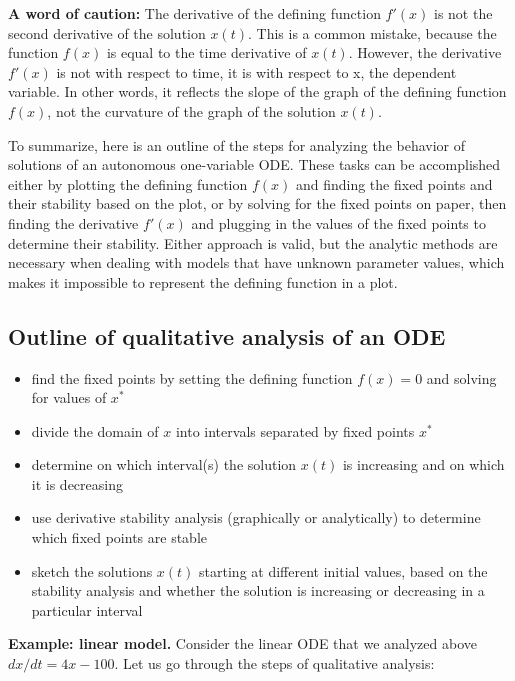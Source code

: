 \documentclass[
  letterpaper,
  DIV=11,
  numbers=noendperiod]{scrreprt}
\begin{document}
\textbf{A word of caution:} The derivative of the defining function
\(f'(x)\) is not the second derivative of the solution \(x(t)\). This is
a common mistake, because the function \(f(x)\) is equal to the time
derivative of \(x(t)\). However, the derivative \(f'(x)\) is not with
respect to time, it is with respect to x, the dependent variable. In
other words, it reflects the slope of the graph of the defining function
\(f(x)\), not the curvature of the graph of the solution \(x(t)\).

To summarize, here is an outline of the steps for analyzing the behavior
of solutions of an autonomous one-variable ODE. These tasks can be
accomplished either by plotting the defining function \(f(x)\) and
finding the fixed points and their stability based on the plot, or by
solving for the fixed points on paper, then finding the derivative
\(f'(x)\) and plugging in the values of the fixed points to determine
their stability. Either approach is valid, but the analytic methods are
necessary when dealing with models that have unknown parameter values,
which makes it impossible to represent the defining function in a plot.

\hypertarget{outline-of-qualitative-analysis-of-an-ode}{%
\subsection{Outline of qualitative analysis of an
ODE}\label{outline-of-qualitative-analysis-of-an-ode}}

\begin{itemize}
\item
  find the fixed points by setting the defining function \(f(x)=0\) and
  solving for values of \(x^*\)
\item
  divide the domain of \(x\) into intervals separated by fixed points
  \(x^*\)
\item
  determine on which interval(s) the solution \(x(t)\) is increasing and
  on which it is decreasing
\item
  use derivative stability analysis (graphically or analytically) to
  determine which fixed points are stable
\item
  sketch the solutions \(x(t)\) starting at different initial values,
  based on the stability analysis and whether the solution is increasing
  or decreasing in a particular interval
\end{itemize}

\textbf{Example: linear model.} Consider the linear ODE that we analyzed
above \(dx/dt = 4x -100\). Let us go through the steps of qualitative
analysis:
\end{document}
